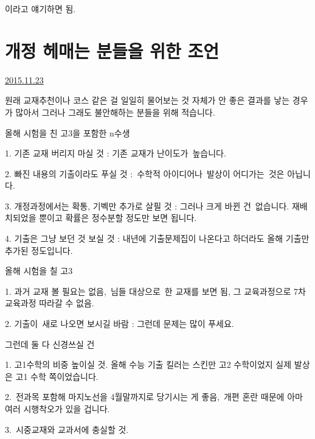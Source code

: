 이라고 얘기하면 됨.
\vspace{5mm}








\section{개정 헤매는 분들을 위한 조언}
\href{https://www.kockoc.com/Apoc/506939}{2015.11.23}

\vspace{5mm}

원래 교재추천이나 코스 같은 걸 일일히 물어보는 것 자체가 안 좋은 결과를 낳는 경우가 많아서 그러나
그래도 불안해하는 분들을 위해 적습니다.
\vspace{5mm}

올해 시험을 친 고3을 포함한 n수생
\vspace{5mm}

\item 1. 기존 교재 버리지 마실 것 : 기존 교재가 난이도가 높습니다.
\item 2. 빠진 내용의 기출이라도 푸실 것 : 수학적 아이디어나 발상이 어디가는 것은 아닙니다.
\item 3. 개정과정에서는 확통, 기벡만 추가로 살필 것 : 그러나 크게 바뀐 건 없습니다. 재배치되었을 뿐이고 확률은 정수분할 정도만 보면 됩니다.
\item 4. 기출은 그냥 보던 것 보실 것 : 내년에 기출문제집이 나온다고 하더라도 올해 기출만 추가된 정도입니다.
\vspace{5mm}

올해 시험을 칠 고3
\vspace{5mm}

\item 1. 과거 교재 볼 필요는 없음, 님들 대상으로 한 교재를 보면 됨, 그 교육과정으로 7차 교육과정 따라갈 수 없음.
\item 2. 기출이 새로 나오면 보시길 바람 : 그런데 문제는 많이 푸세요.
\vspace{5mm}

그런데 둘 다 신경쓰실 건
\vspace{5mm}

\item 1. 고1수학의 비중 높이실 것. 올해 수능 기출 킬러는 스킨만 고2 수학이었지 실제 발상은 고1 수학 쪽이었습니다.
\item 2. 전과목 포함해 마지노선을 4월말까지로 당기시는 게 좋음, 개편 혼란 때문에 아마 여러 시행착오가 있을 겁니다.
\item 3. 시중교재와 교과서에 충실할 것.
\vspace{5mm}

